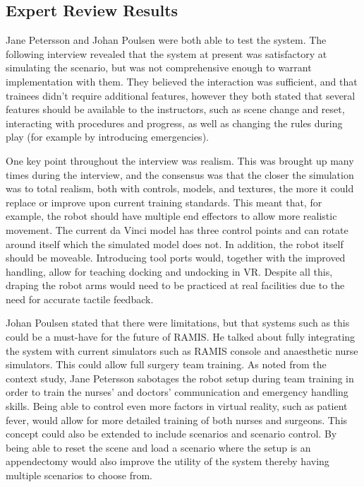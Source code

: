 \subsection{Expert Review Results}

Jane Petersson and Johan Poulsen were both able to test the system. The following interview revealed that the system at present was satisfactory at simulating the scenario, but was not comprehensive enough to warrant implementation with them. They believed the interaction was sufficient, and that trainees didn't require additional features, however they both stated that several features should be available to the instructors, such as scene change and reset, interacting with procedures and progress, as well as changing the rules during play (for example by introducing emergencies).

One key point throughout the interview was realism. This was brought up many times during the interview, and the consensus was that the closer the simulation was to total realism, both with controls, models, and textures, the more it could replace or improve upon current training standards. This meant that, for example, the robot should have multiple end effectors to allow more realistic movement. The current da Vinci model has three control points and can rotate around itself which the simulated model does not. In addition, the robot itself should be moveable. Introducing tool ports would, together with the improved handling, allow for teaching docking and undocking in VR. Despite all this, draping the robot arms would need to be practiced at real facilities due to the need for accurate tactile feedback.

Johan Poulsen stated that there were limitations, but that systems such as this could be a must-have for the future of RAMIS. He talked about fully integrating the system with current simulators such as RAMIS console and anaesthetic nurse simulators. This could allow full surgery team training. As noted from the context study, Jane Petersson sabotages the robot setup during team training in order to train the nurses' and doctors' communication and emergency handling skills. Being able to control even more factors in virtual reality, such as patient fever, would allow for more detailed training of both nurses and surgeons. This concept could also be extended to include scenarios and scenario control. By being able to reset the scene and load a scenario where the setup is an appendectomy would also improve the utility of the system thereby having multiple scenarios to choose from. 

